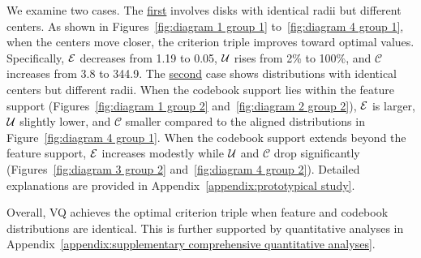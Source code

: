 We examine two cases. The \underline{first} involves disks with identical radii but different centers. As shown in Figures~\ref{fig:diagram 1 group 1} to~\ref{fig:diagram 4 group 1}, when the centers move closer, the criterion triple improves toward optimal values. Specifically, $\mathcal{E}$ decreases from 1.19 to 0.05, $\mathcal{U}$ rises from 2\% to 100\%, and $\mathcal{C}$ increases from 3.8 to 344.9. The \underline{second} case shows distributions with identical centers but different radii. When the codebook support lies within the feature support (Figures~\ref{fig:diagram 1 group 2} and~\ref{fig:diagram 2 group 2}), $\mathcal{E}$ is larger, $\mathcal{U}$ slightly lower, and $\mathcal{C}$ smaller compared to the aligned distributions in Figure~\ref{fig:diagram 4 group 1}. When the codebook support extends beyond the feature support, $\mathcal{E}$ increases modestly while $\mathcal{U}$ and $\mathcal{C}$ drop significantly (Figures~\ref{fig:diagram 3 group 2} and~\ref{fig:diagram 4 group 2}). Detailed explanations are provided in Appendix~\ref{appendix:prototypical study}.

Overall, VQ achieves the optimal criterion triple when feature and codebook distributions are identical. This is further supported by quantitative analyses in Appendix~\ref{appendix:supplementary comprehensive quantitative analyses}.




